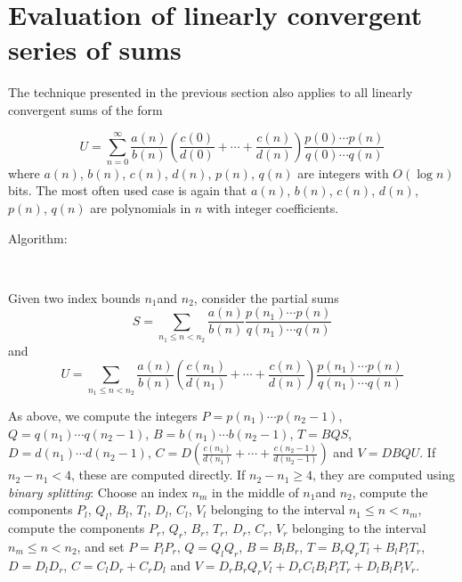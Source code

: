 \section{Evaluation of linearly convergent series of sums}

The technique presented in the previous section also applies to all linearly
convergent sums of the form

\[
U=\sum ^{\infty }_{n=0}\frac{a(n)}{b(n)}\left( \frac{c(0)}{d(0)}+\cdots 
+\frac{c(n)}{d(n)}\right) \frac{p(0)\cdots p(n)}{q(0)\cdots q(n)}\]
 where  \( a(n) \),  \( b(n) \),  \( c(n) \),  \( d(n) \),  \( p(n) \),  
\( q(n) \) are integers with  \( O(\log n) \) bits. The most often
used case is again that  \( a(n) \),  \( b(n) \),  \( c(n) \),  \( d(n) \),  
\( p(n) \),  \( q(n) \) are polynomials in  \( n \) with
integer coefficients.

\begin{description}
\item [Algorithm:]~
\end{description}

Given two index bounds  \( n_{1} \)and  \( n_{2} \), consider the partial sums 
\[
S=\sum _{n_{1}\leq n<n_{2}}\frac{a(n)}{b(n)}
\frac{p(n_{1})\cdots p(n)}{q(n_{1})\cdots q(n)}\]
and 
\[
U=\sum _{n_{1}\leq n<n_{2}}\frac{a(n)}{b(n)}
\left( \frac{c(n_{1})}{d(n_{1})}+\cdots +\frac{c(n)}{d(n)}\right) 
\frac{p(n_{1})\cdots p(n)}{q(n_{1})\cdots q(n)}\]


As above, we compute the integers  \( P={p(n_{1})}\cdots {p(n_{2}-1)} \),  
\( Q={q(n_{1})}\cdots {q(n_{2}-1)} \),  \( B={b(n_{1})}\cdots {b(n_{2}-1)} \),  
\( T=BQS \),  \( D={d(n_{1})}\cdots {d(n_{2}-1)} \),  
\( C=D\left( \frac{c(n_{1})}{d(n_{1})}+\cdots +
\frac{c(n_{2}-1)}{d(n_{2}-1)}\right)  \) and  \( V=DBQU \). 
If  \( n_{2}-n_{1}<4 \), these
are computed directly. If  \( n_{2}-n_{1}\geq 4 \), they are computed using 
{\em binary splitting}: Choose an index  \( n_{m} \) in the middle of
\( n_{1} \)and  \( n_{2} \), compute the components \( P_{l} \),  \( Q_{l} \),
\( B_{l} \),  \( T_{l} \),  \( D_{l} \),  \( C_{l} \),  \( V_{l} \) belonging
to the interval  \( n_{1}\leq n<n_{m} \), compute the components \( P_{r} \),
\( Q_{r} \),  \( B_{r} \),  \( T_{r} \),  \( D_{r} \),  \( C_{r} \),  
\( V_{r} \) belonging to the interval  \( n_{m}\leq n<n_{2} \), and set  
\( P=P_{l}P_{r} \),  \( Q=Q_{l}Q_{r} \),  \( B=B_{l}B_{r} \), 
\( T=B_{r}Q_{r}T_{l}+B_{l}P_{l}T_{r} \),  \( D=D_{l}D_{r} \),  
\( C=C_{l}D_{r}+C_{r}D_{l} \) and  
\( V=D_{r}B_{r}Q_{r}V_{l}+D_{r}C_{l}B_{l}P_{l}T_{r}+D_{l}B_{l}P_{l}V_{r} \).

